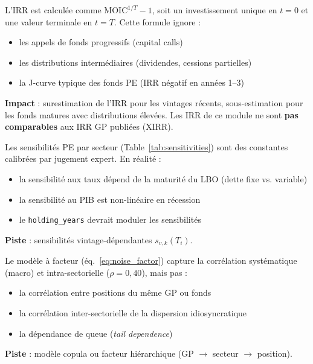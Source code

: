\documentclass[12pt,a4paper]{article}
\begin{document}
\begin{warningbox}
L'IRR est calcul\'{e}e comme $\mathrm{MOIC}^{1/T} - 1$, soit un investissement unique en $t=0$
et une valeur terminale en $t=T$. Cette formule ignore :
\begin{itemize}[nosep]
    \item les appels de fonds progressifs (capital calls)
    \item les distributions interm\'{e}diaires (dividendes, cessions partielles)
    \item la J-curve typique des fonds PE (IRR n\'{e}gatif en ann\'{e}es 1--3)
\end{itemize}
\textbf{Impact} : surestimation de l'IRR pour les vintages r\'{e}cents,
sous-estimation pour les fonds matures avec distributions \'{e}lev\'{e}es.
Les IRR de ce module ne sont \textbf{pas comparables} aux IRR GP publi\'{e}es (XIRR).
\end{warningbox}

\begin{warningbox}
Les sensibilit\'{e}s PE par secteur (Table~\ref{tab:sensitivities}) sont des constantes
calibr\'{e}es par jugement expert. En r\'{e}alit\'{e} :
\begin{itemize}[nosep]
    \item la sensibilit\'{e} aux taux d\'{e}pend de la maturit\'{e} du LBO (dette fixe vs. variable)
    \item la sensibilit\'{e} au PIB est non-lin\'{e}aire en r\'{e}cession
    \item le \texttt{holding\_years} devrait moduler les sensibilit\'{e}s
\end{itemize}
\textbf{Piste} : sensibilit\'{e}s vintage-d\'{e}pendantes $s_{v,k}(T_i)$.
\end{warningbox}

\begin{warningbox}
Le mod\`{e}le \`{a} facteur (\'{e}q.~\eqref{eq:noise_factor}) capture la corr\'{e}lation
syst\'{e}matique (macro) et intra-sectorielle ($\rho = 0{,}40$), mais pas :
\begin{itemize}[nosep]
    \item la corr\'{e}lation entre positions du m\^{e}me GP ou fonds
    \item la corr\'{e}lation inter-sectorielle de la dispersion idiosyncratique
    \item la d\'{e}pendance de queue (\textit{tail dependence})
\end{itemize}
\textbf{Piste} : mod\`{e}le copula ou facteur hi\'{e}rarchique (GP $\rightarrow$ secteur $\rightarrow$ position).
\end{warningbox}
\end{document}
